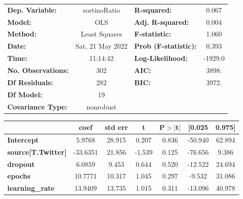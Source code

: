 \begin{center}
\begin{tabular}{lclc}
\toprule
\textbf{Dep. Variable:}                   &   sortinoRatio   & \textbf{  R-squared:         } &     0.067   \\
\textbf{Model:}                           &       OLS        & \textbf{  Adj. R-squared:    } &     0.004   \\
\textbf{Method:}                          &  Least Squares   & \textbf{  F-statistic:       } &     1.060   \\
\textbf{Date:}                            & Sat, 21 May 2022 & \textbf{  Prob (F-statistic):} &    0.393    \\
\textbf{Time:}                            &     11:14:42     & \textbf{  Log-Likelihood:    } &   -1929.0   \\
\textbf{No. Observations:}                &         302      & \textbf{  AIC:               } &     3898.   \\
\textbf{Df Residuals:}                    &         282      & \textbf{  BIC:               } &     3972.   \\
\textbf{Df Model:}                        &          19      & \textbf{                     } &             \\
\textbf{Covariance Type:}                 &    nonrobust     & \textbf{                     } &             \\
\bottomrule
\end{tabular}
\begin{tabular}{lcccccc}
                                          & \textbf{coef} & \textbf{std err} & \textbf{t} & \textbf{P$> |$t$|$} & \textbf{[0.025} & \textbf{0.975]}  \\
\midrule
\textbf{Intercept}                        &       5.9768  &       28.915     &     0.207  &         0.836        &      -50.940    &       62.894     \\
\textbf{source[T.Twitter]}                &     -33.6351  &       21.856     &    -1.539  &         0.125        &      -76.656    &        9.386     \\
\textbf{dropout}                          &       6.0859  &        9.453     &     0.644  &         0.520        &      -12.522    &       24.694     \\
\textbf{epochs}                           &      10.7771  &       10.317     &     1.045  &         0.297        &       -9.532    &       31.086     \\
\textbf{learning\_rate}                   &      13.9409  &       13.735     &     1.015  &         0.311        &      -13.096    &       40.978     \\

\end{tabular}
\end{center}
